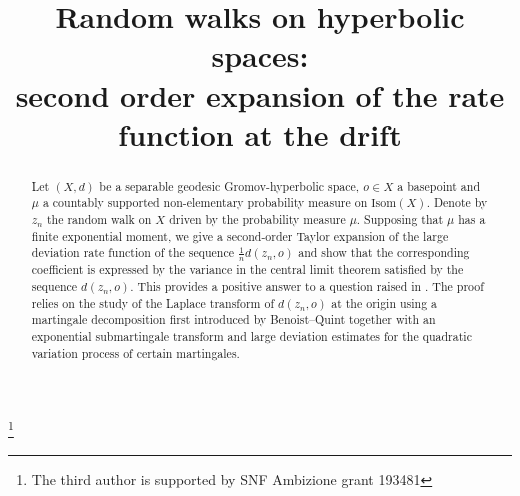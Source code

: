 \documentclass[JEP,XML,SOM,Unicode,published]{cedram}
\theoremstyle{plain}
\theoremstyle{definition}
\begin{document}
\title[Second order expansion of the rate function at the drift]{Random walks on hyperbolic spaces:\\ second order expansion of the rate function at the drift}

\author[\initial{R.} \lastname{Aoun}]{ }
\address{University Gustave Eiffel, Champs-sur-Marne\\
5 boulevard Descartes, Champs-sur-Marne, 77454 Marne-la-Vallée Cedex 2, France}

\author[\initial{P.} \lastname{Mathieu}]{ }
\address{Aix-Marseille Université, CNRS, Centrale Marseille, I2M, UMR 7373\\
13453 Marseille, France}

\author[\initial{C.} \lastname{Sert}]{ }
\address{Institut für Mathematik, Universität Zürich\\
190, Winterthurerstrasse, 8057 Zürich, Switzerland}

\thanks{The third author is supported by SNF Ambizione grant 193481}

\begin{abstract}
Let $(X,d)$ be a separable geodesic Gromov-hyperbolic space, $o \in X$ a basepoint and $\mu$ a countably supported non-elementary probability measure on $\mathrm{Isom}(X)$. Denote by $z_n$ the random walk on $X$ driven by the probability measure $\mu$. Supposing that $\mu$ has a finite exponential moment, we give a second-order Taylor expansion of the large deviation rate function of the sequence $\frac{1}{n}d(z_n,o)$ and show that the corresponding coefficient is expressed by the variance in the central limit theorem satisfied by the sequence $d(z_n,o)$. This provides a positive answer to a question raised in \cite{BMSS}. The proof relies on the study of the Laplace transform of $d(z_n,o)$ at the origin using a martingale decomposition first introduced by Benoist--Quint together with an exponential submartingale transform and large deviation estimates for the quadratic variation process of certain martingales.
\end{abstract}



\end{document}
